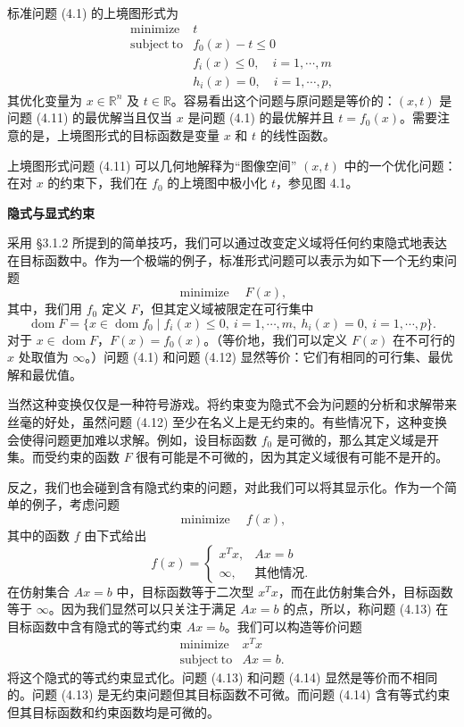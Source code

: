 \documentclass[UTF8, 12pt, fontset=fandol, oneside]{ctexart}
\begin{document}
标准问题 (4.1) 的上境图形式为
\begin{equation}
\begin{array}{ll}
\mathop{\mathrm{minimize}} & t\\
\mathrm{subject\ to} & f_0(x)-t\leq 0\\
& f_i(x)\leq 0,\quad i=1,\cdots,m\\
& h_i(x)=0,\quad i=1,\cdots,p,
\end{array}
\tag{4.11}
\end{equation}
其优化变量为 $x\in\mathbb{R}^n$ 及 $t\in\mathbb{R}$。容易看出这个问题与原问题是等价的：$(x,t)$ 是问题 (4.11) 的最优解当且仅当 $x$ 是问题 (4.1) 的最优解并且 $t=f_0(x)$。需要注意的是，上境图形式的目标函数是变量 $x$ 和 $t$ 的线性函数。

上境图形式问题 (4.11) 可以几何地解释为“图像空间” $(x,t)$ 中的一个优化问题：在对 $x$ 的约束下，我们在 $f_0$ 的上境图中极小化 $t$，参见图 4.1。

\noindent\textbf{隐式与显式约束}

采用 §3.1.2 所提到的简单技巧，我们可以通过改变定义域将任何约束隐式地表达在目标函数中。作为一个极端的例子，标准形式问题可以表示为如下一个无约束问题
\begin{equation}
\mathop{\mathrm{minimize}}\quad F(x),
\tag{4.12}
\end{equation}
其中，我们用 $f_0$ 定义 $F$，但其定义域被限定在可行集中
\[
\operatorname{dom} F=\{x\in\operatorname{dom} f_0\mid f_i(x)\leq 0,\ i=1,\cdots,m,\ h_i(x)=0,\ i=1,\cdots,p\}.
\]
对于 $x\in\operatorname{dom} F$，$F(x)=f_0(x)$。（等价地，我们可以定义 $F(x)$ 在不可行的 $x$ 处取值为 $\infty$。）问题 (4.1) 和问题 (4.12) 显然等价：它们有相同的可行集、最优解和最优值。

当然这种变换仅仅是一种符号游戏。将约束变为隐式不会为问题的分析和求解带来丝毫的好处，虽然问题 (4.12) 至少在名义上是无约束的。有些情况下，这种变换会使得问题更加难以求解。例如，设目标函数 $f_0$ 是可微的，那么其定义域是开集。而受约束的函数 $F$ 很有可能是不可微的，因为其定义域很有可能不是开的。

反之，我们也会碰到含有隐式约束的问题，对此我们可以将其显示化。作为一个简单的例子，考虑问题
\begin{equation}
\mathop{\mathrm{minimize}}\quad f(x),
\tag{4.13}
\end{equation}
其中的函数 $f$ 由下式给出
\[
f(x)=
\begin{cases}
x^Tx, & Ax=b\\
\infty, & \text{其他情况}.
\end{cases}
\]
在仿射集合 $Ax=b$ 中，目标函数等于二次型 $x^Tx$，而在此仿射集合外，目标函数等于 $\infty$。因为我们显然可以只关注于满足 $Ax=b$ 的点，所以，称问题 (4.13) 在目标函数中含有隐式的等式约束 $Ax=b$。我们可以构造等价问题
\begin{equation}
\begin{array}{ll}
\mathop{\mathrm{minimize}} & x^Tx\\
\mathrm{subject\ to} & Ax=b.
\end{array}
\tag{4.14}
\end{equation}
将这个隐式的等式约束显式化。问题 (4.13) 和问题 (4.14) 显然是等价而不相同的。问题 (4.13) 是无约束问题但其目标函数不可微。而问题 (4.14) 含有等式约束但其目标函数和约束函数均是可微的。
\end{document}

